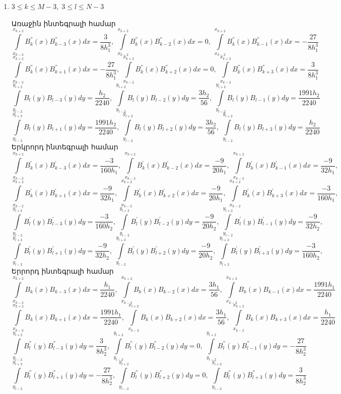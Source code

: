 \documentclass[fleqn, bachelor,subf,12pt,notitlepage]{disser}
\begin{document}
\begin{enumerate}

\item{$3 \leq k \leq M-3, \; 3 \leq l \leq N-3$}

Առաջին ինտեգրալի համար
$$\int \limits_{x_{k-2}}^{x_{k+2}}B_{k}^{''}(x)B_{k-3}^{''}(x)dx = \dfrac{3}{8h_{1}^3}, \; \int \limits_{x_{k-2}}^{x_{k+2}}B_{k}^{''}(x)B_{k-2}^{''}(x)dx = 0, \; \int \limits_{x_{k-2}}^{x_{k+2}}B_{k}^{''}(x)B_{k-1}^{''}(x)dx = -\dfrac{27}{8h_{1}^3}$$
$$\int \limits_{x_{k-2}}^{x_{k+2}}B_{k}^{''}(x)B_{k+1}^{''}(x)dx =-\dfrac{27}{8h_{1}^3}, \; \int \limits_{x_{k-2}}^{x_{k+2}}B_{k}^{''}(x)B_{k+2}^{''}(x)dx = 0, \; \int \limits_{x_{k-2}}^{x_{k+2}}B_{k}^{''}(x)B_{k+3}^{''}(x)dx =  \dfrac{3}{8h_{1}^3}$$
$$\int \limits_{y_{l-2}}^{y_{l+2}}B_{l}(y)B_{l-3}(y)dy=\dfrac{h_{2}}{2240}, \; \int \limits_{y_{l-2}}^{y_{l+2}}B_{l}(y)B_{l-2}(y)dy=\dfrac{3h_{2}}{56}, \; \int \limits_{y_{l-2}}^{y_{l+2}}B_{l}(y)B_{l-1}(y)dy=\dfrac{1991h_{2}}{2240}$$
$$\int \limits_{y_{l-2}}^{y_{l+2}}B_{l}(y)B_{l+1}(y)dy=\dfrac{1991h_{2}}{2240}, \; \int \limits_{y_{l-2}}^{y_{l+2}}B_{l}(y)B_{l+2}(y)dy=\dfrac{3h_{2}}{56}, \; \int \limits_{y_{l-2}}^{y_{l+2}}B_{l}(y)B_{l+3}(y)dy=\dfrac{h_{2}}{2240}$$
Երկրորդ ինտեգրալի համար
$$\int \limits_{x_{k-2}}^{x_{k+2}}B_{k}^{'}(x)B_{k-3}^{'}(x)dx=\dfrac{-3}{160h_{1}}, \; \int \limits_{x_{k-2}}^{x_{k+2}}B_{k}^{'}(x)B_{k-2}^{'}(x)dx=\dfrac{-9}{20h_{1}}, \; \int \limits_{x_{k-2}}^{x_{k+2}}B_{k}^{'}(x)B_{k-1}^{'}(x)dx=\dfrac{-9}{32h_{1}}, \;$$
$$\int \limits_{x_{k-2}}^{x_{k+2}}B_{k}^{'}(x)B_{k+1}^{'}(x)dx=\dfrac{-9}{32h_{1}}, \; \int \limits_{x_{k-2}}^{x_{k+2}}B_{k}^{'}(x)B_{k+2}^{'}(x)dx=\dfrac{-9}{20h_{1}}, \; \int \limits_{x_{k-2}}^{x_{k+2}}B_{k}^{'}(x)B_{k+3}^{'}(x)dx=\dfrac{-3}{160h_{1}}, \;$$
$$\int \limits_{y_{l-2}}^{y_{l+2}}B_{l}^{'}(y)B_{l-3}^{'}(y)dy=\dfrac{-3}{160h_{2}}, \; \int \limits_{y_{l-2}}^{y_{l+2}}B_{l}^{'}(y)B_{l-2}^{'}(y)dy=\dfrac{-9}{20h_{2}}, \; \int \limits_{y_{l-2}}^{y_{l+2}}B_{l}^{'}(y)B_{l-1}^{'}(y)dy=\dfrac{-9}{32h_{2}}, \;$$
$$\int \limits_{y_{l-2}}^{y_{l+2}}B_{l}^{'}(y)B_{l+1}^{'}(y)dy=\dfrac{-9}{32h_{2}}, \; \int \limits_{y_{l-2}}^{y_{l+2}}B_{l}^{'}(y)B_{l+2}^{'}(y)dy=\dfrac{-9}{20h_{2}}, \; \int \limits_{y_{l+2}}^{y_{l+2}}B_{l}^{'}(y)B_{l+3}^{'}(y)dy=\dfrac{-3}{160h_{2}}, \;$$
Երրորդ ինտեգրալի համար
$$\int \limits_{x_{k-2}}^{x_{k+2}}B_{k}(x)B_{k-3}(x)dx=\dfrac{h_{1}}{2240}, \; \int \limits_{x_{k-2}}^{x_{k+2}}B_{k}(x)B_{k-2}(x)dx=\dfrac{3h_{1}}{56}, \; \int \limits_{x_{k-2}}^{x_{k+2}}B_{k}(x)B_{k-1}(x)dx=\dfrac{1991h_{1}}{2240}$$
$$\int \limits_{x_{k-2}}^{x_{k+2}}B_{k}(x)B_{k+1}(x)dx=\dfrac{1991h_{1}}{2240}, \; \int \limits_{x_{k-2}}^{x_{l+2}}B_{k}(x)B_{k+2}(x)dx=\dfrac{3h_{1}}{56}, \; \int \limits_{x_{k-2}}^{x_{k+2}}B_{k}(x)B_{k+3}(x)dx=\dfrac{h_{1}}{2240}$$
$$\int \limits_{y_{l-2}}^{y_{l+2}}B_{l}^{''}(y)B_{l-3}^{''}(y)dy = \dfrac{3}{8h_{2}^3}, \; \int \limits_{y_{l-2}}^{y_{l+2}}B_{l}^{''}(y)B_{l-2}^{''}(y)dy = 0, \; \int \limits_{y_{l-2}}^{y_{l+2}}B_{l}^{''}(y)B_{l-1}^{''}(y)dy = -\dfrac{27}{8h_{2}^3}$$
$$\int \limits_{y_{l-2}}^{y_{l+2}}B_{l}^{''}(y)B_{l+1}^{''}(y)dy =-\dfrac{27}{8h_{2}^3}, \; \int \limits_{y_{l-2}}^{y_{l+2}}B_{l}^{''}(y)B_{l+2}^{''}(y)dy = 0, \; \int \limits_{y_{l-2}}^{y_{l+2}}B_{l}^{''}(y)B_{l+3}^{''}(y)dy =  \dfrac{3}{8h_{2}^3}$$


\end{enumerate}
\end{document}
